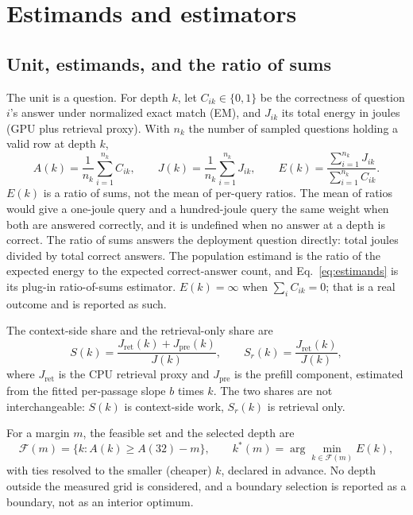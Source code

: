 \section{Estimands and estimators}\label{sec:s2}

\subsection{Unit, estimands, and the ratio of sums}

The unit is a question. For depth $k$, let $C_{ik}\in\{0,1\}$ be the correctness of question
$i$'s answer under normalized exact match (EM), and $J_{ik}$ its total energy in joules (GPU plus
retrieval proxy). With $n_k$ the number of sampled questions holding a valid row at depth $k$,
\begin{equation}
A(k)=\frac{1}{n_k}\sum_{i=1}^{n_k} C_{ik},
\qquad
J(k)=\frac{1}{n_k}\sum_{i=1}^{n_k} J_{ik},
\qquad
E(k)=\frac{\sum_{i=1}^{n_k} J_{ik}}{\sum_{i=1}^{n_k} C_{ik}}.
\label{eq:estimands}
\end{equation}
$E(k)$ is a ratio of sums, not the mean of per-query ratios. The mean of ratios would give a
one-joule query and a hundred-joule query the same weight when both are answered correctly, and
it is undefined when no answer at a depth is correct. The ratio of sums answers the deployment
question directly: total joules divided by total correct answers. The population estimand is the
ratio of the expected energy to the expected correct-answer count, and Eq.~\ref{eq:estimands} is
its plug-in ratio-of-sums estimator. $E(k)=\infty$ when $\sum_i C_{ik}=0$; that is a real outcome
and is reported as such.

The context-side share and the retrieval-only share are
\begin{equation}
S(k)=\frac{J_{\mathrm{ret}}(k)+J_{\mathrm{pre}}(k)}{J(k)},
\qquad
S_r(k)=\frac{J_{\mathrm{ret}}(k)}{J(k)},
\label{s:eq:shares}
\end{equation}
where $J_{\mathrm{ret}}$ is the CPU retrieval proxy and $J_{\mathrm{pre}}$ is the prefill
component, estimated from the fitted per-passage slope $b$ times $k$. The two shares are not
interchangeable: $S(k)$ is context-side work, $S_r(k)$ is retrieval only.

For a margin $m$, the feasible set and the selected depth are
\begin{equation}
\mathcal{F}(m)=\{k: A(k)\ge A(32)-m\},
\qquad
k^{*}(m)=\arg\min_{k\in\mathcal{F}(m)} E(k),
\label{eq:feasible}
\end{equation}
with ties resolved to the smaller (cheaper) $k$, declared in advance. No depth outside the
measured grid is considered, and a boundary selection is reported as a boundary, not as an
interior optimum.


